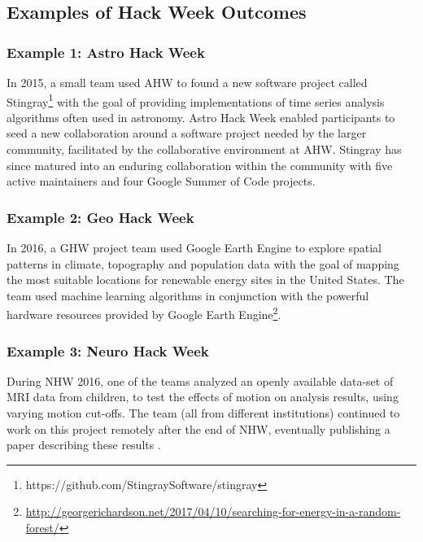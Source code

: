 \subsection*{Examples of Hack Week Outcomes}
\label{sec:outcomes}
\subsubsection*{Example 1: Astro Hack Week}
In 2015, a small team used AHW to found a new software project called Stingray\footnote{https://github.com/StingraySoftware/stingray} with the goal of providing implementations of time series analysis algorithms often used in astronomy.
Astro Hack Week enabled participants to seed a new collaboration around a software project needed by the larger community, facilitated by the collaborative environment at AHW.
Stingray has since matured into an enduring collaboration within the community with five active maintainers and four Google Summer of Code projects.
\subsubsection*{Example 2: Geo Hack Week}
In 2016, a GHW project team used Google Earth Engine to explore spatial patterns in climate, topography and population data with the goal of mapping the most suitable locations for renewable energy sites in the United States.
The team used machine learning algorithms in conjunction with the powerful hardware resources provided by Google Earth Engine\footnote{\url{http://georgerichardson.net/2017/04/10/searching-for-energy-in-a-random-forest/}}.
\subsubsection*{Example 3: Neuro Hack Week}
During NHW 2016, one of the teams analyzed an openly available data-set of MRI data from children\cite{Di_Martino2014-qf}, to test the effects of motion on analysis results, using varying motion cut-offs.
The team (all from  different institutions) continued to work on this project remotely after the end of NHW, eventually publishing a paper describing these results \cite{leonard2017}.
